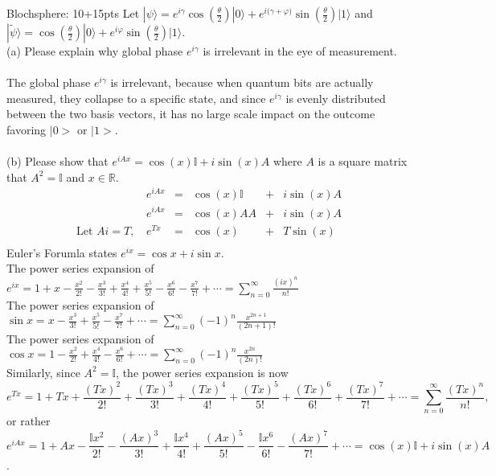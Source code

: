 \documentclass[12pt]{article}
\makeatletter
\newcommand{\<}{\langle}
\renewcommand{\>}{\rangle}
\newcommand{\kets}[1]{| #1 \rangle}                 %
\newenvironment{problem}{\@startsection
       {section}
       {1}
       {-.2em}
       {-3.5ex plus -1ex minus -.2ex}
       {2.3ex plus .2ex}
       {\pagebreak[3]
       \large\bf\noindent{Problem }
       }
       }
       {%
       \begin{center}\large\bf \end{center}}
\def\ket#1{\big|{#1}\big>}
\makeatother
\begin{document}
\begin{problem}{Blochsphere: 10+15pts}
Let $\kets{\psi} = e^{i\gamma} \cos{(\frac{\theta}{2})}\kets{0} + e^{i{(\gamma + \varphi})}\sin{(\frac{\theta}{2})} \kets{1}$ and $\kets{\tilde{\psi}} = \cos{(\frac{\theta}{2})}\kets{0} + e^{i\varphi}\sin{(\frac{\theta}{2})}\kets{1}$. \\
(a) Please explain why global phase $ e^{i\gamma}$ is irrelevant in the eye of measurement. \\ \\
The global phase $e^{i\gamma}$ is irrelevant, because when quantum bits are actually measured, they collapse to a specific state, and since $e^{i\gamma}$ is evenly distributed between the two basis vectors, it has no large scale impact on the outcome favoring $\ket{0}$ or $\ket{1}$.\\ \\
(b) Please show that $e^{iAx} = \cos(x) \mathbb{I} + i\sin(x)A$ where $A $ is a square matrix that $A^2 = \mathbb{I}$ and $x \in \mathbb{R}.$\\
$$\begin{array}{ccccccc}
&e^{iAx} &=& \cos(x) \mathbb{I} &+& i\sin(x)A\\
&e^{iAx} &=& \cos(x)AA &+& i\sin(x)A\\ 
\text{Let }Ai = T \text{, } &e^{Tx} &=& \cos(x) &+& T\sin(x)\\
\end{array}$$
Euler's Forumla states $e^{ix} = \cos x + i\sin x$.\\
The power series expansion of \\ \hspace*{2.42cm}$e^{ix} = 1 + x - \frac{x^2}{2!} - \frac{x^3}{3!} + \frac{x^4}{4!} + \frac{x^5}{5!} - \frac{x^6}{6!} - \frac{x^7}{7!} + \cdots = \sum\limits_{n = 0}^{\infty}\frac{(ix)^n}{n!}$\\
The power series expansion of $\sin x = x - \frac{x^3}{3!} + \frac{x^5}{5!} - \frac{x^7}{7!} + \cdots = \sum\limits_{n = 0}^{\infty}(-1)^n\frac{x^{2n+1}}{(2n+1)!}$\\
The power series expansion of $\cos x = 1 - \frac{x^2}{2!} + \frac{x^4}{4!} - \frac{x^6}{6!} + \cdots= \sum\limits_{n = 0}^{\infty}(-1)^n\frac{x^{2n}}{(2n)!}$\\ 
Similarly, since $A^2 = \mathbb{I}$, the power series expansion is now 
$$e^{Tx} = 1 + Tx + \frac{(Tx)^2}{2!} + \frac{(Tx)^3}{3!} + \frac{(Tx)^4}{4!} + \frac{(Tx)^5}{5!} + \frac{(Tx)^6}{6!} + \frac{(Tx)^7}{7!} + \cdots = \sum\limits_{n = 0}^{\infty}\frac{(Tx)^n}{n!},$$
or rather $$e^{iAx} = 1 + Ax - \frac{\mathbb{I}x^2}{2!} - \frac{(Ax)^3}{3!} + \frac{\mathbb{I}x^4}{4!} + \frac{(Ax)^5}{5!} - \frac{\mathbb{I}x^6}{6!} - \frac{(Ax)^7}{7!} + \cdots = \cos(x) \mathbb{I} + i\sin(x)A$$.
\end{problem}
\newpage
\end{document}
